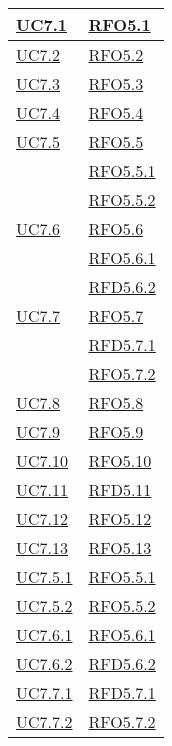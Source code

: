 \begin{longtable}{|>{\centering}m{5cm}|m{5cm}<{\centering}|}
\hyperlink{UC7.1}{UC7.1} & \hyperlink{RFO5.1}{RFO5.1}\\\hline
\hyperlink{UC7.2}{UC7.2} & \hyperlink{RFO5.2}{RFO5.2}\\\hline
\hyperlink{UC7.3}{UC7.3} & \hyperlink{RFO5.3}{RFO5.3}\\\hline
\hyperlink{UC7.4}{UC7.4} & \hyperlink{RFO5.4}{RFO5.4}\\\hline
\hyperlink{UC7.5}{UC7.5}
& \hyperlink{RFO5.5}{RFO5.5}\\
& \hyperlink{RFO5.5.1}{RFO5.5.1}\\
& \hyperlink{RFO5.5.2}{RFO5.5.2}\\\hline
\hyperlink{UC7.6}{UC7.6} 
& \hyperlink{RFO5.6}{RFO5.6}\\
& \hyperlink{RFO5.6.1}{RFO5.6.1}\\
& \hyperlink{RFD5.6.2}{RFD5.6.2}\\\hline
\hyperlink{UC7.7}{UC7.7} & \hyperlink{RFO5.7}{RFO5.7}\\
& \hyperlink{RFD5.7.1}{RFD5.7.1}\\
& \hyperlink{RFO5.7.2}{RFO5.7.2}\\\hline
\hyperlink{UC7.8}{UC7.8} & \hyperlink{RFO5.8}{RFO5.8}\\\hline
\hyperlink{UC7.9}{UC7.9} & \hyperlink{RFO5.9}{RFO5.9}\\\hline
\hyperlink{UC7.10}{UC7.10} & \hyperlink{RFO5.10}{RFO5.10}\\\hline
\hyperlink{UC7.11}{UC7.11} & \hyperlink{RFD5.11}{RFD5.11}\\\hline
\hyperlink{UC7.12}{UC7.12} & \hyperlink{RFO5.12}{RFO5.12}\\\hline
\hyperlink{UC7.13}{UC7.13} & \hyperlink{RFO5.13}{RFO5.13}\\\hline

\hyperlink{UC7.5.1}{UC7.5.1} & \hyperlink{RFO5.5.1}{RFO5.5.1}\\\hline
\hyperlink{UC7.5.2}{UC7.5.2} & \hyperlink{RFO5.5.2}{RFO5.5.2}\\\hline

\hyperlink{UC7.6.1}{UC7.6.1} & \hyperlink{RFO5.6.1}{RFO5.6.1}\\\hline
\hyperlink{UC7.6.2}{UC7.6.2} & \hyperlink{RFD5.6.2}{RFD5.6.2}\\\hline

\hyperlink{UC7.7.1}{UC7.7.1} & \hyperlink{RFD5.7.1}{RFD5.7.1}\\\hline
\hyperlink{UC7.7.2}{UC7.7.2} & \hyperlink{RFO5.7.2}{RFO5.7.2}\\\hline


\end{longtable}
